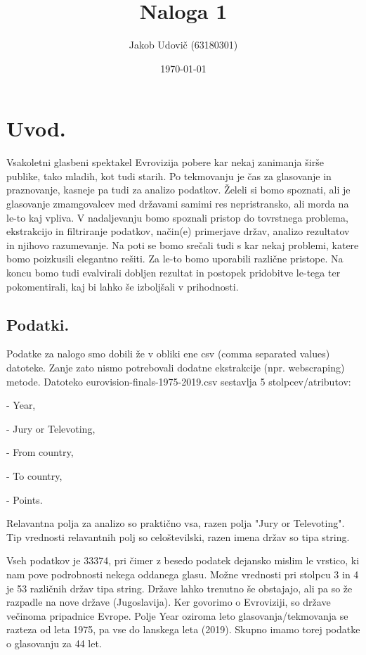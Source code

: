\documentclass[a4paper,11pt]{article}
\title{Naloga 1}
\author{Jakob Udovič (63180301)}
\date{\today}
\begin{document}
\maketitle

\section{Uvod.}
Vsakoletni glasbeni spektakel Evrovizija pobere kar nekaj zanimanja širše publike, tako mladih, kot tudi starih. Po
tekmovanju je čas za glasovanje in praznovanje, kasneje pa tudi za analizo podatkov.
Želeli si bomo spoznati, ali je glasovanje zmamgovalcev med državami samimi res nepristransko, ali morda na le-to kaj vpliva.
V nadaljevanju bomo spoznali pristop do tovrstnega problema, ekstrakcijo in filtriranje podatkov, način(e) primerjave
držav, analizo rezultatov in njihovo razumevanje.
Na poti se bomo srečali tudi s kar nekaj problemi, katere bomo poizkusili elegantno rešiti. Za le-to bomo uporabili različne
pristope. Na koncu bomo tudi evalvirali dobljen rezultat in postopek pridobitve le-tega ter pokomentirali, kaj bi lahko še
izboljšali v prihodnosti.

\subsection{Podatki.}
Podatke za nalogo smo dobili že v obliki ene csv (comma separated values) datoteke. Zanje zato nismo potrebovali dodatne ekstrakcije
(npr. webscraping) metode.
Datoteko eurovision-finals-1975-2019.csv sestavlja 5 stolpcev/atributov:

- Year,

- Jury or Televoting,

- From country,

- To country,

- Points.

Relavantna polja za analizo so praktično vsa, razen polja "Jury or Televoting".
Tip vrednosti relavantnih polj so celoštevilski, razen imena držav so tipa string.

Vseh podatkov je 33374, pri čimer z besedo podatek dejansko mislim le vrstico, ki nam pove podrobnosti nekega oddanega glasu.
Možne vrednosti pri stolpcu 3 in 4 je 53 različnih držav tipa string. Države lahko trenutno še obstajajo, ali pa so že
razpadle na nove države (Jugoslavija). Ker govorimo o Evroviziji, so države večinoma pripadnice Evrope.
Polje Year oziroma leto glasovanja/tekmovanja se razteza od leta 1975, pa vse do lanskega leta (2019). Skupno imamo torej
podatke o glasovanju za 44 let.
\end{document}
